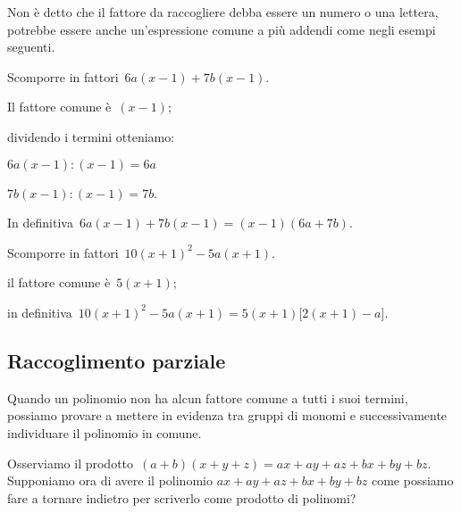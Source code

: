 Non è detto che il fattore da raccogliere debba essere un numero o una lettera, 
potrebbe essere anche un'espressione comune a più addendi come negli esempi 
seguenti.



 \begin{esempio}
Scomporre in fattori~$6a(x-1)+7b(x-1)$.
  \begin{enumeratea}
  \item Il fattore comune è~$(x-1)$; 
  \item dividendo i termini otteniamo:
   \begin{itemize*}
    \item $6a(x-1):(x-1)=6a$
    \item $7b(x-1):(x-1)=7b$.
   \end{itemize*}
  \end{enumeratea}
  \item In definitiva~$6a(x-1)+7b(x-1)=(x-1)(6a+7b)$.
 \end{esempio}

 \begin{esempio}
Scomporre in fattori~$10(x+1)^{2}-5a(x+1)$.
  \begin{enumeratea}
  \item il fattore comune è~$5(x+1)$;
  \item in definitiva~$10(x+1)^{2}-5a(x+1)=5(x+1)\bigl[2(x+1)-a \bigr]$.
  \end{enumeratea}
 \end{esempio}


% 

\subsection{Raccoglimento parziale}
\label{subsec:divpol_raccoglimentoparziale}

Quando un polinomio non ha alcun fattore comune a tutti i suoi termini, 
possiamo provare a mettere in evidenza tra gruppi di monomi
e successivamente individuare il polinomio in comune.

Osserviamo il prodotto~$(a+b)(x+y+z)=ax+ay+az+bx+by+bz$. Supponiamo ora di 
avere il polinomio $ax+ay+az+bx+by+bz$ come possiamo fare a tornare indietro 
per scriverlo come prodotto di polinomi?

